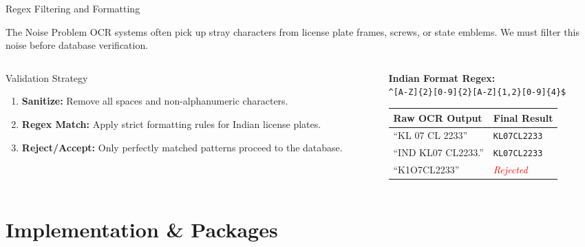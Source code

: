 \documentclass[aspectratio=169,11pt]{beamer}
\begin{document}
\begin{frame}{Regex Filtering and Formatting}
\begin{block}{The Noise Problem}
OCR systems often pick up stray characters from license plate frames, screws, or state emblems. We must filter this noise before database verification.
\end{block}

\begin{columns}
\begin{column}{0.48\textwidth}
\begin{exampleblock}{Validation Strategy}
\begin{enumerate}
    \item \textbf{Sanitize:} Remove all spaces and non-alphanumeric characters.
    \item \textbf{Regex Match:} Apply strict formatting rules for Indian license plates.
    \item \textbf{Reject/Accept:} Only perfectly matched patterns proceed to the database.
\end{enumerate}
\end{exampleblock}
\end{column}
\begin{column}{0.48\textwidth}
\centering
\textbf{Indian Format Regex:}\\
\vspace{0.5em}
\texttt{\^{}[A-Z]\{2\}[0-9]\{2\}[A-Z]\{1,2\}[0-9]\{4\}\$}

\vspace{0.8em}
\begin{tabular}{ll}
\toprule
\textbf{Raw OCR Output} & \textbf{Final Result} \\
\midrule
``KL 07 CL 2233'' & \texttt{KL07CL2233} \\
``IND KL07 CL2233.'' & \texttt{KL07CL2233} \\
``K1O7CL2233'' & \textcolor{red}{\textsl{Rejected}} \\
\bottomrule
\end{tabular}
\end{column}
\end{columns}
\end{frame}

\section{Implementation \& Packages}
\end{document}
